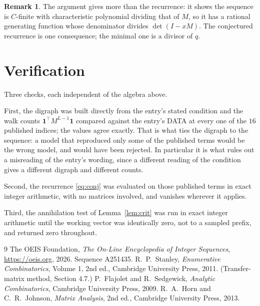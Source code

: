 \documentclass[11pt,a4paper]{article}
\theoremstyle{plain}
\theoremstyle{definition}
\newtheorem{remark}[theorem]{Remark}
\begin{document}
\begin{remark}
The argument gives more than the recurrence: it shows the sequence is $C$-finite with
characteristic polynomial dividing that of $M$, so it has a rational generating function
whose denominator divides $\det(I-xM)$. The conjectured recurrence is one consequence; the
minimal one is a divisor of $q$.
\end{remark}

\section{Verification}

Three checks, each independent of the algebra above.

First, the digraph was built directly from the entry's stated condition and the walk counts
$\mathbf{1}^{\!\top}M^{L-1}\mathbf{1}$ compared against the entry's DATA at
every one of the $16$ published indices; the values agree exactly. That is what ties
the digraph to the sequence: a model that reproduced only some of the published terms would
be the wrong model, and would have been rejected. In particular it is what rules out a
misreading of the entry's wording, since a different reading of the condition gives a
different digraph and different counts.

Second, the recurrence \eqref{eq:conj} was evaluated on those published terms in exact
integer arithmetic, with no matrices involved, and vanishes wherever it applies.

Third, the annihilation test of Lemma~\ref{lem:crit} was run in exact integer arithmetic
until the working vector was identically zero, not to a sampled prefix, and returned zero
throughout.

\begin{thebibliography}{9}
 The OEIS Foundation, \emph{The On-Line Encyclopedia of Integer
Sequences}, \url{https://oeis.org}, 2026. Sequence A251435.
 R.~P.~Stanley, \emph{Enumerative Combinatorics}, Volume 1, 2nd ed.,
Cambridge University Press, 2011. (Transfer-matrix method, Section 4.7.)
 P.~Flajolet and R.~Sedgewick, \emph{Analytic Combinatorics}, Cambridge
University Press, 2009.
 R.~A.~Horn and C.~R.~Johnson, \emph{Matrix Analysis}, 2nd ed., Cambridge
University Press, 2013.
\end{thebibliography}
\end{document}
